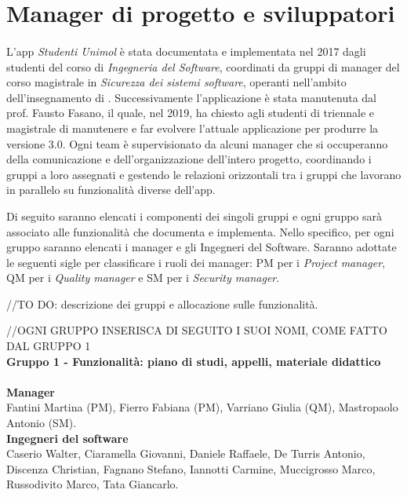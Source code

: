 \section{Manager di progetto e sviluppatori}

\paragraph{}
L'app \textit{Studenti Unimol} è stata documentata e implementata nel 2017 dagli studenti del corso di \textit{Ingegneria del Software}, coordinati da gruppi di manager del corso magistrale in \textit{Sicurezza dei sistemi software}, operanti nell'ambito dell'insegnamento di . Successivamente l'applicazione è stata manutenuta dal prof. Fausto Fasano, il quale, nel 2019, ha chiesto agli studenti di triennale e magistrale di manutenere e far evolvere l'attuale applicazione per produrre la versione 3.0. Ogni team è supervisionato da alcuni manager che si occuperanno della comunicazione e dell'organizzazione dell'intero progetto, coordinando i gruppi a loro assegnati e gestendo le relazioni orizzontali tra i gruppi che lavorano in parallelo su funzionalità diverse dell'app.

Di seguito saranno elencati i componenti dei singoli gruppi e ogni gruppo sarà associato alle funzionalità che documenta e implementa. Nello specifico, per ogni gruppo saranno elencati i manager e gli Ingegneri del Software. Saranno adottate le seguenti sigle per classificare i ruoli dei manager: PM per i \textit{Project manager}, QM per i \textit{Quality manager} e SM per i \textit{Security manager}. \newline

//TO DO: descrizione dei gruppi e allocazione sulle funzionalità.

//OGNI GRUPPO INSERISCA DI SEGUITO I SUOI NOMI, COME FATTO DAL GRUPPO 1 \\

\textbf {Gruppo 1 - Funzionalità: piano di studi, appelli, materiale didattico} \\ \\
\textbf{Manager} \\
Fantini Martina (PM), Fierro Fabiana (PM), Varriano Giulia (QM), Mastropaolo Antonio (SM). \\
\textbf{Ingegneri del software} \\
Caserio Walter, Ciaramella Giovanni, Daniele Raffaele, De Turris Antonio, Discenza Christian, Fagnano Stefano, Iannotti Carmine,  Muccigrosso Marco, Russodivito Marco, Tata Giancarlo.

